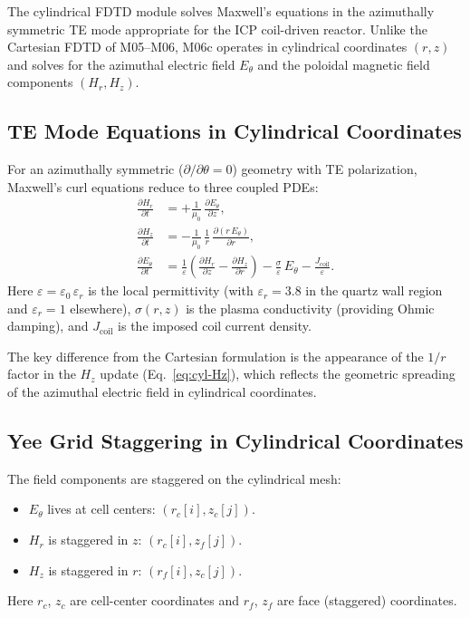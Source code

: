 \documentclass[11pt,a4paper]{report}
\begin{document}
The cylindrical FDTD module solves Maxwell's equations in the azimuthally symmetric TE mode appropriate for the ICP coil-driven reactor.  Unlike the Cartesian FDTD of M05--M06, M06c operates in cylindrical coordinates $(r, z)$ and solves for the azimuthal electric field $E_\theta$ and the poloidal magnetic field components $(H_r, H_z)$.

\subsection{TE Mode Equations in Cylindrical Coordinates}

For an azimuthally symmetric ($\partial/\partial\theta = 0$) geometry with TE polarization, Maxwell's curl equations reduce to three coupled PDEs:
\begin{align}
  \frac{\partial H_r}{\partial t} &= +\frac{1}{\mu_0}\,\frac{\partial E_\theta}{\partial z},
  \label{eq:cyl-Hr} \\[4pt]
  \frac{\partial H_z}{\partial t} &= -\frac{1}{\mu_0}\,\frac{1}{r}\,\frac{\partial (r\,E_\theta)}{\partial r},
  \label{eq:cyl-Hz} \\[4pt]
  \frac{\partial E_\theta}{\partial t} &= \frac{1}{\varepsilon}\!\left(\frac{\partial H_r}{\partial z} - \frac{\partial H_z}{\partial r}\right)
  - \frac{\sigma}{\varepsilon}\,E_\theta - \frac{J_\mathrm{coil}}{\varepsilon}.
  \label{eq:cyl-Etheta}
\end{align}
Here $\varepsilon = \varepsilon_0\,\varepsilon_r$ is the local permittivity (with $\varepsilon_r = 3.8$ in the quartz wall region and $\varepsilon_r = 1$ elsewhere), $\sigma(r,z)$ is the plasma conductivity (providing Ohmic damping), and $J_\mathrm{coil}$ is the imposed coil current density.

The key difference from the Cartesian formulation is the appearance of the $1/r$ factor in the $H_z$ update (Eq.~\eqref{eq:cyl-Hz}), which reflects the geometric spreading of the azimuthal electric field in cylindrical coordinates.

\subsection{Yee Grid Staggering in Cylindrical Coordinates}

The field components are staggered on the cylindrical mesh:
\begin{itemize}
  \item $E_\theta$ lives at cell centers: $(r_c[i], z_c[j])$.
  \item $H_r$ is staggered in $z$: $(r_c[i], z_f[j])$.
  \item $H_z$ is staggered in $r$: $(r_f[i], z_c[j])$.
\end{itemize}
Here $r_c$, $z_c$ are cell-center coordinates and $r_f$, $z_f$ are face (staggered) coordinates.
\end{document}
